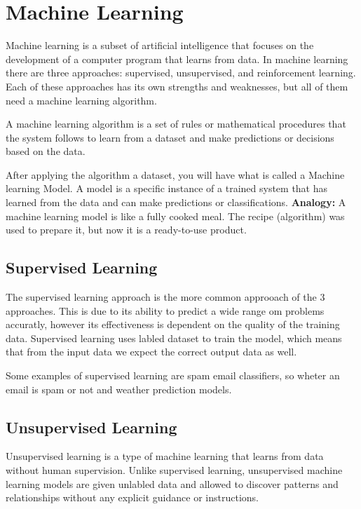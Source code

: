 \section{Machine Learning}
\label{sec:Machine Learning}

Machine learning is a subset of artificial intelligence
that focuses on the development of a computer program that learns from data.
In machine learning there are three approaches: supervised, unsupervised, and reinforcement learning.
Each of these approaches has its own strengths and weaknesses, but all of them need a machine learning algorithm.

A machine learning algorithm is a set of rules or mathematical
procedures that the system follows to learn from a dataset
and make predictions or decisions based on the data.

After applying the algorithm a dataset, you will have what is called a Machine learning Model.
A model is a specific instance of a trained system that has learned from the data and can make predictions or classifications.
\cite{ML-Models}
\textbf{Analogy:} A machine learning model is like a fully cooked meal.
The recipe (algorithm) was used to prepare it, but now it is a ready-to-use product.

\subsection{Supervised Learning}
The supervised learning approach is the more common approoach of the 3 approaches.
This is due to its ability to predict a wide range om problems accuratly,
however its effectiveness is dependent on the quality of the training data.
Supervised learning uses labled dataset to train the model,
which means that from the input data we expect the correct output data as well.
\cite{GoogleCloud-SL}

Some examples of supervised learning are spam email classifiers,
so wheter an email is spam or not and weather prediction models.

\subsection{Unsupervised Learning}
Unsupervised learning is a type of machine learning
that learns from data without human supervision. Unlike supervised learning,
unsupervised machine learning models are given unlabled data and allowed to discover patterns
and relationships without any explicit guidance or instructions. \cite{GoogleCloud-UL}

